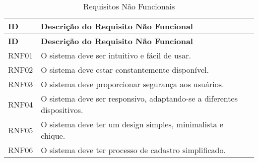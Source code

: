 \begin{longtable}{|p{}|p{}|}
	\caption{Requisitos Não Funcionais} \label{tab:requisitos-nao-funcionais}\\
	\hline
	\textbf{ID} & \textbf{Descrição do Requisito Não Funcional} \\
	\hline
	\endfirsthead
	
	\hline
	\textbf{ID} & \textbf{Descrição do Requisito Não Funcional} \\
	\hline
	\endhead
	
	RNF01 & O sistema deve ser intuitivo e fácil de usar. \\ \hline
	RNF02 & O sistema deve estar constantemente disponível. \\ \hline
	RNF03 & O sistema deve proporcionar segurança aos usuários. \\ \hline
	RNF04 & O sistema deve ser responsivo, adaptando-se a diferentes dispositivos. \\ \hline
	RNF05 & O sistema deve ter um design simples, minimalista e chique. \\ \hline
	RNF06 & O sistema deve ter processo de cadastro simplificado. \\ \hline
\end{longtable}


